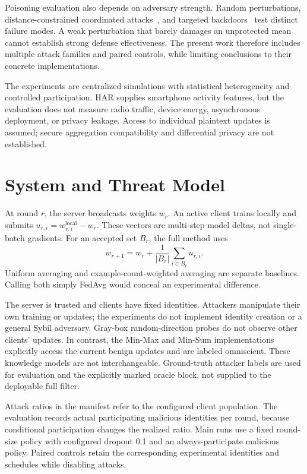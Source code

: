 \documentclass[journal]{IEEEtran}
\begin{document}
Poisoning evaluation also depends on adversary strength. Random perturbations, distance-constrained coordinated attacks~\cite{shejwalkar2021}, and targeted backdoors~\cite{bagdasaryan2020} test distinct failure modes. A weak perturbation that barely damages an unprotected mean cannot establish strong defense effectiveness. The present work therefore includes multiple attack families and paired controls, while limiting conclusions to their concrete implementations.

The experiments are centralized simulations with statistical heterogeneity and controlled participation. HAR supplies smartphone activity features, but the evaluation does not measure radio traffic, device energy, asynchronous deployment, or privacy leakage. Access to individual plaintext updates is assumed; secure aggregation compatibility and differential privacy are not established.

\section{System and Threat Model}
At round $r$, the server broadcasts weights $w_r$. An active client trains locally and submits $u_{r,i}=w^{\mathrm{local}}_{r,i}-w_r$. These vectors are multi-step model deltas, not single-batch gradients. For an accepted set $B_r$, the full method uses
\begin{equation}
w_{r+1}=w_r+\frac{1}{|B_r|}\sum_{i\in B_r}u_{r,i}.
\end{equation}
Uniform averaging and example-count-weighted averaging are separate baselines. Calling both simply FedAvg would conceal an experimental difference.

The server is trusted and clients have fixed identities. Attackers manipulate their own training or updates; the experiments do not implement identity creation or a general Sybil adversary. Gray-box random-direction probes do not observe other clients' updates. In contrast, the Min-Max and Min-Sum implementations explicitly access the current benign updates and are labeled omniscient. These knowledge models are not interchangeable. Ground-truth attacker labels are used for evaluation and the explicitly marked oracle block, not supplied to the deployable full filter.

Attack ratios in the manifest refer to the configured client population. The evaluation records actual participating malicious identities per round, because conditional participation changes the realized ratio. Main runs use a fixed round-size policy with configured dropout 0.1 and an always-participate malicious policy. Paired controls retain the corresponding experimental identities and schedules while disabling attacks.
\end{document}
